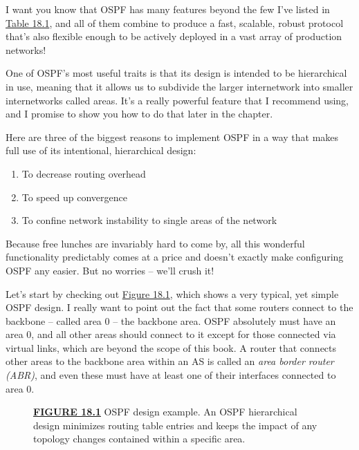 I want you know that OSPF has many features beyond the few I've listed
in \protect\hyperlink{c18.xhtmlux5cux23table18-1}{Table 18.1}, and all
of them combine to produce a fast, scalable, robust protocol that's also
flexible enough to be actively deployed in a vast array of production
networks!

One of OSPF's most useful traits is that its design is intended to be
hierarchical in use, meaning that it allows us to subdivide the larger
internetwork into smaller internetworks
\protect\hypertarget{c18.xhtmlux5cux23Page_748}{}{}called areas. It's a
really powerful feature that I recommend using, and I promise to show
you how to do that later in the chapter.

Here are three of the biggest reasons to implement OSPF in a way that
makes full use of its intentional, hierarchical design:

\begin{enumerate}
\item
  To decrease routing overhead
\item
  To speed up convergence
\item
  To confine network instability to single areas of the network
\end{enumerate}

Because free lunches are invariably hard to come by, all this wonderful
functionality predictably comes at a price and doesn't exactly make
configuring OSPF any easier. But no worries -- we'll crush it!

Let's start by checking out
\protect\hyperlink{c18.xhtmlux5cux23figure18-1}{Figure 18.1}, which
shows a very typical, yet simple OSPF design. I really want to point out
the fact that some routers connect to the backbone -- called area 0 -- the
backbone area. OSPF absolutely must have an area 0, and all other areas
should connect to it except for those connected via virtual links, which
are beyond the scope of this book. A router that connects other areas to
the backbone area within an AS is called an \emph{area border router
(ABR)}, and even these must have at least one of their interfaces
connected to area 0.

\begin{figure}
\centering
\caption{{\protect\hyperlink{c18.xhtmlux5cux23figureanchor18-1}{\textbf{FIGURE
18.1}} OSPF design example. An OSPF hierarchical design minimizes
routing table entries and keeps the impact of any topology changes
contained within a specific area.}}
\end{figure}

